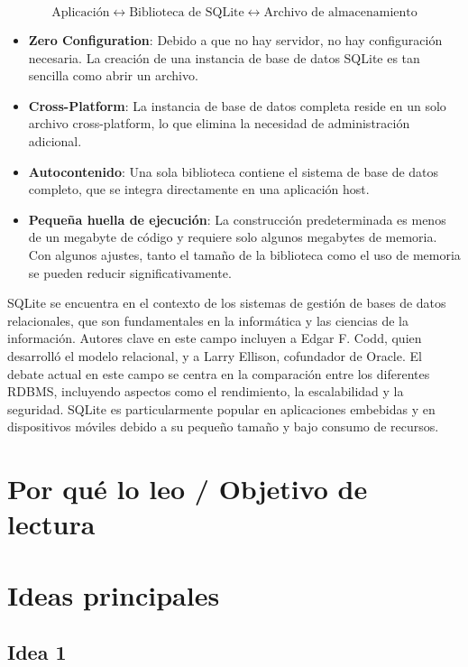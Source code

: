 \[ \text{Aplicación} \leftrightarrow \text{Biblioteca de SQLite} \leftrightarrow \text{Archivo de almacenamiento} \]

\begin{itemize}
\tightlist
\item
  \textbf{\textbf{Zero Configuration}}: Debido a que no hay servidor, no hay configuración necesaria. La creación de una instancia de base de datos SQLite es tan sencilla como abrir un archivo.
\item
  \textbf{\textbf{Cross-Platform}}: La instancia de base de datos completa reside en un solo archivo cross-platform, lo que elimina la necesidad de administración adicional.
\item
  \textbf{\textbf{Autocontenido}}: Una sola biblioteca contiene el sistema de base de datos completo, que se integra directamente en una aplicación host.
\item
  \textbf{\textbf{Pequeña huella de ejecución}}: La construcción predeterminada es menos de un megabyte de código y requiere solo algunos megabytes de memoria. Con algunos ajustes, tanto el tamaño de la biblioteca como el uso de memoria se pueden reducir significativamente.
\end{itemize}

SQLite se encuentra en el contexto de los sistemas de gestión de bases de datos relacionales, que son fundamentales en la informática y las ciencias de la información. Autores clave en este campo incluyen a Edgar F. Codd, quien desarrolló el modelo relacional, y a Larry Ellison, cofundador de Oracle. El debate actual en este campo se centra en la comparación entre los diferentes RDBMS, incluyendo aspectos como el rendimiento, la escalabilidad y la seguridad. SQLite es particularmente popular en aplicaciones embebidas y en dispositivos móviles debido a su pequeño tamaño y bajo consumo de recursos.

\section{Por qué lo leo / Objetivo de lectura}\label{por-quuxe9-lo-leo-objetivo-de-lectura}

\section{Ideas principales}\label{ideas-principales}

\subsection{Idea 1}\label{idea-1}

